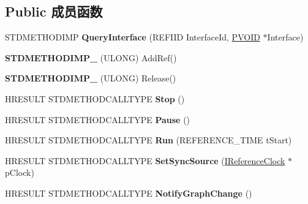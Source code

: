 \subsection*{Public 成员函数}
\begin{DoxyCompactItemize}
\item 
\mbox{\label{class_c_ks_basic_audio_a5632290d47bb22edd6f28bae34306c6b}} 
S\+T\+D\+M\+E\+T\+H\+O\+D\+I\+MP {\bfseries Query\+Interface} (R\+E\+F\+I\+ID Interface\+Id, \hyperlink{interfacevoid}{P\+V\+O\+ID} $\ast$Interface)
\item 
\mbox{\label{class_c_ks_basic_audio_a53f3f5821aab6eb0b9194ad67eb68ed8}} 
{\bfseries S\+T\+D\+M\+E\+T\+H\+O\+D\+I\+M\+P\+\_\+} (U\+L\+O\+NG) Add\+Ref()
\item 
\mbox{\label{class_c_ks_basic_audio_a080f9bb6ea0c09cd76fc46ee912b3705}} 
{\bfseries S\+T\+D\+M\+E\+T\+H\+O\+D\+I\+M\+P\+\_\+} (U\+L\+O\+NG) Release()
\item 
\mbox{\label{class_c_ks_basic_audio_aa1b3e9ab1689728764a2e7564f729b4b}} 
H\+R\+E\+S\+U\+LT S\+T\+D\+M\+E\+T\+H\+O\+D\+C\+A\+L\+L\+T\+Y\+PE {\bfseries Stop} ()
\item 
\mbox{\label{class_c_ks_basic_audio_a8772b7d6bf67202e84d7b037b90d5314}} 
H\+R\+E\+S\+U\+LT S\+T\+D\+M\+E\+T\+H\+O\+D\+C\+A\+L\+L\+T\+Y\+PE {\bfseries Pause} ()
\item 
\mbox{\label{class_c_ks_basic_audio_a00b12d6604189c9262dafd6ae5f0325c}} 
H\+R\+E\+S\+U\+LT S\+T\+D\+M\+E\+T\+H\+O\+D\+C\+A\+L\+L\+T\+Y\+PE {\bfseries Run} (R\+E\+F\+E\+R\+E\+N\+C\+E\+\_\+\+T\+I\+ME t\+Start)
\item 
\mbox{\label{class_c_ks_basic_audio_a5966c276f082b1c35a4c112f7fd55322}} 
H\+R\+E\+S\+U\+LT S\+T\+D\+M\+E\+T\+H\+O\+D\+C\+A\+L\+L\+T\+Y\+PE {\bfseries Set\+Sync\+Source} (\hyperlink{interface_i_reference_clock}{I\+Reference\+Clock} $\ast$p\+Clock)
\item 
\mbox{\label{class_c_ks_basic_audio_a29fd358c81358ba75546c7e53fba69b9}} 
H\+R\+E\+S\+U\+LT S\+T\+D\+M\+E\+T\+H\+O\+D\+C\+A\+L\+L\+T\+Y\+PE {\bfseries Notify\+Graph\+Change} ()

\end{DoxyCompactItemize}

